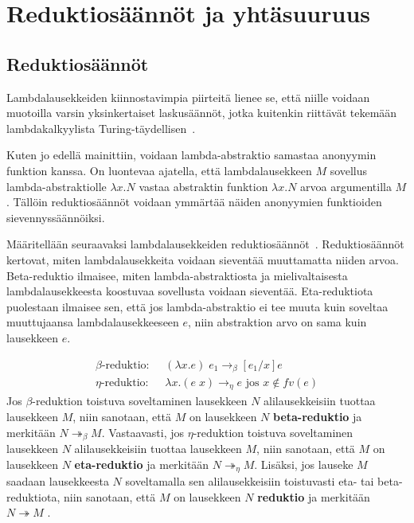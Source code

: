 \section{Reduktiosäännöt ja yhtäsuuruus}

\subsection{Reduktiosäännöt}
Lambdalausekkeiden kiinnostavimpia piirteitä lienee se, että niille voidaan muotoilla varsin yksinkertaiset laskusäännöt, jotka kuitenkin riittävät tekemään lambdakalkyylista Turing-täydellisen~\cite[liite]{Turing36}.  
\par
Kuten jo edellä mainittiin, voidaan lambda-abstraktio samastaa anonyymin funktion kanssa. On luontevaa ajatella, että lambdalausekkeen $M$ sovellus lambda-abstraktiolle $\lambda x . N$ vastaa abstraktin funktion $\lambda x . N$ arvoa argumentilla $M$. Tällöin reduktiosäännöt voidaan ymmärtää näiden anonyymien funktioiden sievennyssäännöiksi.
\par
Määritellään seuraavaksi lambdalausekkeiden reduktiosäännöt~\cite[s.~9]{Hudak89}. Reduktiosäännöt kertovat, miten lambdalausekkeita voidaan sieventää muuttamatta niiden arvoa. Beta-reduktio ilmaisee, miten lambda-abstraktiosta ja mielivaltaisesta lambdalausekkeesta koostuvaa sovellusta voidaan sieventää. Eta-reduktiota puolestaan ilmaisee sen, että jos lambda-abstraktio ei tee muuta kuin soveltaa muuttujaansa lambdalausekkeeseen $e$, niin abstraktion arvo on sama kuin lausekkeen $e$.    

\begin{maar}[reduktiosäännöt]	
\begin{align*}			
\beta \text{-reduktio: }& \; (\lambda x.e )\; e_{1} \rightarrow_{\beta} [e_{1} / x]e \\
\eta \text{-reduktio: }& \; \lambda x.(e \; x) \rightarrow_{\eta} e \text{ jos } x \notin fv(e)
\end{align*}
Jos $\beta$-reduktion toistuva soveltaminen lausekkeen $N$ alilausekkeisiin tuottaa lausekkeen $M$, niin sanotaan, että $M$ on lausekkeen $N$ \textbf{beta-reduktio} ja merkitään $N  \twoheadrightarrow_{\beta} M$. Vastaavasti, jos $\eta$-reduktion toistuva soveltaminen lausekkeen $N$ alilausekkeisiin tuottaa lausekkeen $M$, niin sanotaan, että $M$ on lausekkeen $N$ \textbf{eta-reduktio} ja merkitään $N  \twoheadrightarrow_{\eta} M$. Lisäksi, jos lauseke $M$ saadaan lausekkeesta $N$ soveltamalla sen alilausekkeisiin toistuvasti eta- tai beta-reduktiota, niin sanotaan, että $M$ on lausekkeen $N$ \textbf{reduktio} ja merkitään $N  \twoheadrightarrow M$        .
\end{maar}

